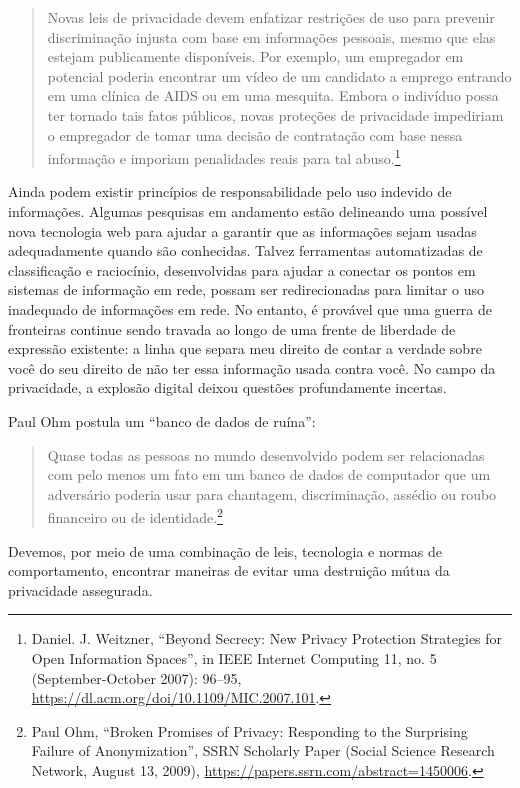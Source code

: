 \documentclass{book}
\begin{document}
\begin{quote}
    Novas leis de privacidade devem enfatizar restrições de uso para prevenir
    discriminação injusta com base em informações pessoais, mesmo que elas estejam
    publicamente disponíveis. Por exemplo, um empregador em potencial poderia
    encontrar um vídeo de um candidato a emprego entrando em uma clínica de AIDS ou
    em uma mesquita. Embora o indivíduo possa ter tornado tais fatos públicos, novas
    proteções de privacidade impediriam o empregador de tomar uma decisão de
    contratação com base nessa informação e imporiam penalidades reais para tal
    abuso.\footnote{Daniel. J. Weitzner, ``Beyond Secrecy: New Privacy Protection
    Strategies for Open Information Spaces'', in IEEE Internet Computing 11, no. 5
    (September-October 2007): 96--95,
    \url{https://dl.acm.org/doi/10.1109/MIC.2007.101}.}
\end{quote}

Ainda podem existir princípios de responsabilidade pelo uso indevido de
informações. Algumas pesquisas em andamento estão delineando uma possível nova
tecnologia web para ajudar a garantir que as informações sejam usadas
adequadamente quando são conhecidas. Talvez ferramentas automatizadas de
classificação e raciocínio, desenvolvidas para ajudar a conectar os pontos em
sistemas de informação em rede, possam ser redirecionadas para limitar o uso
inadequado de informações em rede. No entanto, é provável que uma guerra de
fronteiras continue sendo travada ao longo de uma frente de liberdade de
expressão existente: a linha que separa meu direito de contar a verdade sobre
você do seu direito de não ter essa informação usada contra você. No campo da
privacidade, a explosão digital deixou questões profundamente incertas.

Paul Ohm postula um ``banco de dados de ruína'':

\begin{quote}
    Quase todas as pessoas no mundo desenvolvido podem ser relacionadas com pelo
    menos um fato em um banco de dados de computador que um adversário poderia usar
    para chantagem, discriminação, assédio ou roubo financeiro ou de
    identidade.\footnote{Paul Ohm, ``Broken Promises of Privacy: Responding to the
    Surprising Failure of Anonymization'', SSRN Scholarly Paper (Social Science
    Research Network, August 13, 2009),
    \url{https://papers.ssrn.com/abstract=1450006}.}
\end{quote}

Devemos, por meio de uma combinação de leis, tecnologia e normas de
comportamento, encontrar maneiras de evitar uma destruição mútua da privacidade
assegurada.
\end{document}
